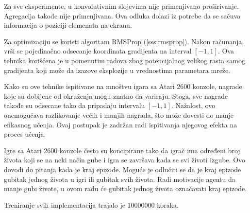 \par 
Za sve eksperimente, u konvolutivnim slojevima nije primenjivano proširivanje. Agregacija takođe nije primenjivana. Ova odluka dolazi iz potrebe da se sačuva informacija o poziciji elemenata na ekranu.
\par 
Za optimizaciju se koristi algoritam RMSProp (\ref{sss:rmsprop}). Nakon računanja, vrši se pojedinačno odsecanje koordinata gradijenta na interval $[-1, 1]$. Ova tehnika korišćena je u pomenutim radova zbog potencijalnog velikog rasta samog gradijenta koji može da izazove eksplozije u vrednostima parametara mreže.
\par 
Kako su ove tehnike ispitivane na mnoštvu igara sa Atari 2600 konzole, nagrade koje su dobijene od okruženja mogu znatno da variraju. Stoga, sve nagrade takođe su odsecane tako da pripadaju intervalu $[-1, 1]$. Nažalost, ovo onemogućava razlikovanje većih i manjih nagrada, što može dovesti do manje efikasnog učenja. Ovaj postupak je zadržan radi ispitivanja njegovog efekta na proces učenja.
\par 
Igre sa Atari 2600 konzole često su koncipirane tako da igrač ima određeni broj života koji se na neki način gube i igra se završava kada se svi životi izgube. Ovo dovodi do pitanja kada je kraj epizode. Moguće je odlučiti se da je kraj epizode gubitak jednog života u igri ili gubitak svih života. Radi motivacije agentu da manje gubi živote, u ovom radu će gubitak jednog života označavati kraj epizode.
\par 
Treniranje svih implementacija trajalo je $10000000$ koraka.
